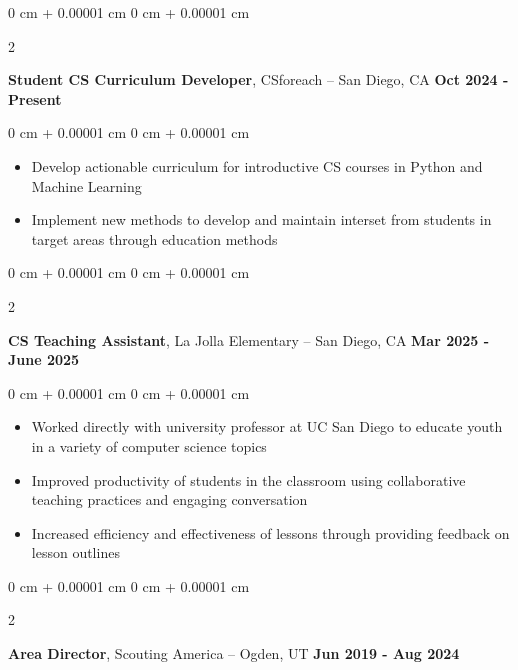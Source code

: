 \documentclass[10pt, letterpaper]{article}
\newenvironment{highlights}{
    \begin{itemize}[
        topsep=0.10 cm,
        parsep=0.10 cm,
        partopsep=0pt,
        itemsep=0pt,
        leftmargin=0 cm + 10pt
    ]
}{
    \end{itemize}
} %
\newenvironment{onecolentry}{
    \begin{adjustwidth}{
        0 cm + 0.00001 cm
    }{
        0 cm + 0.00001 cm
    }
}{
    \end{adjustwidth}
} %
\newenvironment{twocolentry}[2][]{
    \onecolentry%
    \def\secondColumn{#2}
    \setcolumnwidth{\fill, 6.0 cm}
    \begin{paracol}{2}
}{
    \switchcolumn\raggedleft\secondColumn%
    \end{paracol}
    \endonecolentry%
} %
\begin{document}
        \vspace{0.2 cm}

        \begin{twocolentry}{
            {\color{secondaryColor}\textbf{Oct 2024 - Present}}
        }
            \textbf{Student CS Curriculum Developer}, CSforeach -- San Diego, CA\end{twocolentry}

        \vspace{0.10 cm}
        \begin{onecolentry}
            \begin{highlights}
                \item Develop actionable curriculum for introductive CS courses in Python and Machine Learning
                \item Implement new methods to develop and maintain interset from students in target areas through education methods
            \end{highlights}
        \end{onecolentry}


        \vspace{0.2 cm}

        \begin{twocolentry}{
            {\color{secondaryColor}\textbf{Mar 2025 - June 2025}}
        }
            \textbf{CS Teaching Assistant}, La Jolla Elementary -- San Diego, CA\end{twocolentry}

        \vspace{0.10 cm}
        \begin{onecolentry}
            \begin{highlights}
                \item Worked directly with university professor at UC San Diego to educate youth in a variety of computer science topics
                \item Improved productivity of students in the classroom using collaborative teaching practices and engaging conversation
                \item Increased efficiency and effectiveness of lessons through providing feedback on lesson outlines
            \end{highlights}
        \end{onecolentry}
        
        \vspace{0.2 cm}


        \begin{twocolentry}{
            {\color{secondaryColor}\textbf{Jun 2019 - Aug 2024}}
        }
            \textbf{Area Director}, Scouting America -- Ogden, UT\end{twocolentry}
\end{document}
